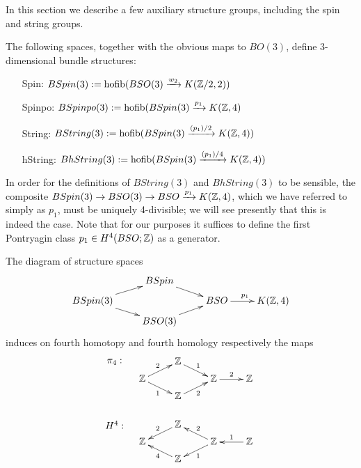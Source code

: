 \documentclass{amsart}
\begin{document}
In this section we describe a few auxiliary structure groups, including the spin and string groups.

\begin{definition}
The following spaces, together with the obvious maps to $BO(3)$, define 3-dimensional bundle structures:
\begin{itemize}
\item[Spin:] $BSpin(3) := \operatorname{hofib}(BSO(3) \xrightarrow{w_2} K(\mathbb Z/2,2))$
\item[Spinpo:] $BSpinpo(3) := \operatorname{hofib}(BSpin(3) \xrightarrow{p_1} K(\mathbb Z,4)$
\item[String:] $BString(3) := \operatorname{hofib}(BSpin(3) \xrightarrow{(p_1)/2} K(\mathbb Z,4))$
\item[hString:] $BhString(3) := \operatorname{hofib}(BSpin(3) \xrightarrow{(p_1)/4} K(\mathbb Z,4))$
\end{itemize}
\end{definition}

\nid In order for the definitions of $BString(3)$ and $BhString(3)$ to be sensible, the composite $BSpin(3) \rightarrow BSO(3) \rightarrow BSO \xrightarrow{p_1} K(\mathbb Z,4)$, which we have referred to simply as $p_1$, must be uniquely 4-divisible; we will see presently that this is indeed the case.  Note that for our purposes it suffices to define the first Pontryagin class $p_1 \in H^4(BSO;\mathbb Z)$ as a generator.

\begin{proposition} \label{prop-H4}
The diagram of structure spaces
\begin{equation} \nn
\xymatrix@R=5pt{
& BSpin \ar[dr] & & \\
BSpin(3) \ar[ur] \ar[dr] && BSO \ar[r]^{p_1} & K(\ZZ,4) \\
& BSO(3) \ar[ur] & &
}
\end{equation}
induces on fourth homotopy and fourth homology respectively the maps
\begin{equation} \nn
\xymatrix@R=5pt{
\save[]+<-1cm,0cm>*{\pi_4:}\restore & \ZZ \ar[dr]^{1} & & \\
\ZZ \ar[ur]^{2} \ar[dr]_{1} && \ZZ \ar[r]^{2} & \ZZ \\
& \ZZ \ar[ur]_{2} & & \\
&&& \\
\save[]+<-1cm,0cm>*{H^4:}\restore & \ZZ \ar[dl]_{2} & & \\
\ZZ && \ZZ \ar[ul]_{2} \ar[dl]^{1} & \ZZ \ar[l]_{1} \\
& \ZZ \ar[ul]^{4} & &
}
\end{equation}
\end{proposition}
\end{document}
